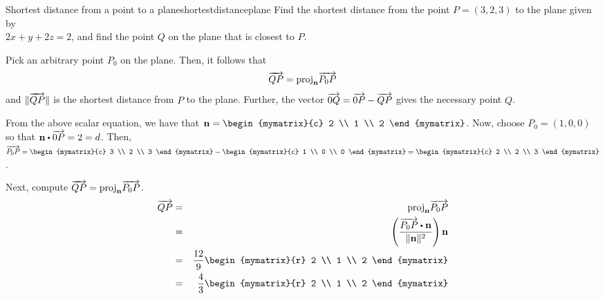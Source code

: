 \begin{example}{Shortest distance from a point to a plane}{shortestdistanceplane}
Find the shortest distance from the point $P = (3,2,3)$ to the plane given by \\ $ 2x + y + 2z = 2$, and find the point $Q$ on the plane that is closest to $P$. 
\end{example}

\begin{solution}
Pick an arbitrary point $P_0$ on the plane. Then, it follows that
\[
\overrightarrow{QP} = \mbox{proj}_{{\bf n}}\overrightarrow{P_0P}
\]
and $\|\overrightarrow{QP}\|$ is the shortest distance from $P$ to the plane. Further, the vector $\overrightarrow{0Q} = \overrightarrow{0P} - \overrightarrow{QP}$ gives the necessary point $Q$. 

From the above scalar equation, we have that $\vect{n} = 
\begin{mymatrix}{c}
2 \\
1 \\
2 
\end{mymatrix}$. Now, choose $P_0 = (1, 0, 0)$ so that $\vect{n} \dotprod \longvect{0P} = 2 = d$. 
Then, $\longvect{P_0P} = \begin{mymatrix}{c}
3 \\
2 \\
3
\end{mymatrix}
- 
\begin{mymatrix}{c}
1 \\
0 \\
0
\end{mymatrix}
=
\begin{mymatrix}{c}
2 \\
2 \\
3
\end{mymatrix}$. 

Next, compute $\overrightarrow{QP} = \mbox{proj}_{{\bf n}}\overrightarrow{P_0P}$. 
\begin{eqnarray*}
\longvect{QP} &=& \func{proj}_{\vect{n}}\longvect{P_0P} \\
&=& \tup{\frac{ \longvect{P_0P} \dotprod \vect{n}}{\norm{\vect{n}} ^2}}\vect{n} \\
&=& \frac{12}{9} \begin{mymatrix}{r}
2 \\
1 \\
2
\end{mymatrix} \\
&=& \frac{4}{3} \begin{mymatrix}{r}
2 \\
1 \\
2
\end{mymatrix} 
\end{eqnarray*}


\end{solution}
